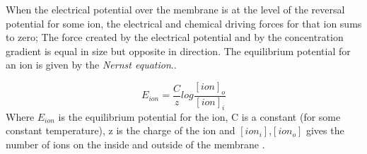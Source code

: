 When the electrical potential over the membrane is at the level of the reversal potential for some ion, the electrical and chemical driving forces for that ion sums to zero;
The force created by the electrical potential and by the concentration gradient is equal in size but opposite in direction.
The equilibrium potential for an ion is given by the \emph{Nernst equation}\cite{NeuroscienceExploringTheBrain3edKAP3}..

\begin{equation}
	\label{eqNernstEquation}
 	E_{ion} = \frac{C}{z} log\frac{[ion]_o}{[ion]_i}
\end{equation}
Where $E_{ion}$ is the equilibrium potential for the ion, C is a constant (for some constant temperature), z is the charge of the ion and $[ion_i]$,$[ion_o]$ gives the number of ions on the inside and outside of the membrane
\cite{NeuroscienceExploringTheBrain3edKAP3}.

